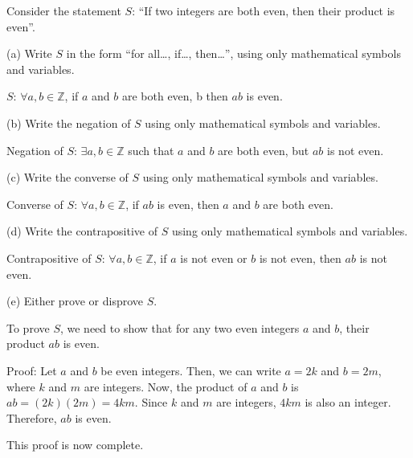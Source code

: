 \documentclass{article}
\begin{document}
Consider the statement $S$: ``If two integers are both even, then their product is even''.

(a) Write $S$ in the form ``for all\ldots, if\ldots, then\ldots'', using only mathematical symbols and variables.

$S$: $\forall a, b \in \mathbb{Z}$, if $a$ and $b$ are both even, b then $ab$ is even.

(b) Write the negation of $S$ using only mathematical symbols and variables.

Negation of $S$: $\exists a, b \in \mathbb{Z}$ such that $a$ and $b$ are both even, but $ab$ is not even.

(c) Write the converse of $S$ using only mathematical symbols and variables.

Converse of $S$: $\forall a, b \in \mathbb{Z}$, if $ab$ is even, then $a$ and $b$ are both even.

(d) Write the contrapositive of $S$ using only mathematical symbols and variables.

Contrapositive of $S$: $\forall a, b \in \mathbb{Z}$, if $a$ is not even or $b$ is not even, then $ab$ is not even.

(e) Either prove or disprove $S$.

To prove $S$, we need to show that for any two even integers $a$ and $b$, their product $ab$ is even.

Proof: Let $a$ and $b$ be even integers. Then, we can write $a = 2k$ and $b = 2m$, where $k$ and $m$ are integers. Now, the product of $a$ and $b$ is $ab = (2k)(2m) = 4km$. Since $k$ and $m$ are integers, $4km$ is also an integer. Therefore, $ab$ is even.

This proof is now complete.
\end{document}
